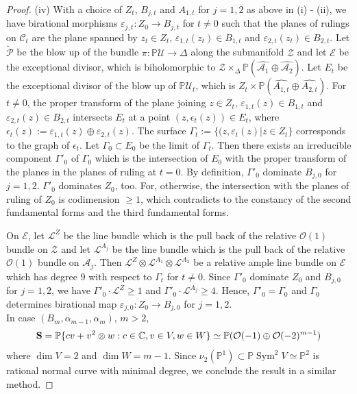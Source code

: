 \documentclass[12pt]{amsart}
\theoremstyle{plain}
\theoremstyle{definition}
\def\Sym{\operatorname{Sym}}
\begin{document}
\begin{proof}
(iv) With a choice of $Z_t$, $B_{j,t}$ and $A_{1,t}$ for $j=1, 2$ as above in (i) - (ii), we have birational morphisms $\varepsilon_{j,t}\colon Z_0 \rightarrow B_{j,t}$ for $t \neq 0$ such that the planes of rulings on $\mathcal C_t$ are the plane spanned by $z_t \in Z_t$, $\varepsilon_{1,t}(z_t)  \in B_{1,t}$ and $\varepsilon_{2,t}(z_t)  \in B_{2,t}$.
Let $\tilde{\mathcal P}$ be the blow up of the bundle $\pi: \mathbb P \mathcal U\rightarrow \Delta$ along the submanifold $\mathcal Z$ and let ${\mathcal E}$ be the exceptional divisor,  which is biholomorphic to $\mathcal Z \times _{\Delta}\mathbb P (\widehat {\mathcal A_1} \oplus \widehat{\mathcal A_2})$. Let $E_t$ be the exceptional divisor of the blow up of $\mathbb P \mathcal U_t$, which is $Z_t \times \mathbb P (\widehat{A_{1,t}} \oplus \widehat{A_{2,t}})$. %
 For $t \neq 0$, the proper transform of the plane joining $z \in Z_t$, $\varepsilon_{1,t}(z)  \in B_{1,t}$ and $\varepsilon_{2,t}(z)  \in B_{2,t}$ intersects $E_t$ at a point $(z,\epsilon_t(z)) \in  E_t$, where $\epsilon_t(z):=\varepsilon_{1,t}(z)\oplus\varepsilon_{2,t}(z)$. The surface $\Gamma_t:=\{(z, \varepsilon_t (z)| z \in Z_t\}$ corresponds to the graph of $\epsilon_t$.
Let $\Gamma_0 \subset E_0$ be the limit of $\Gamma_t$.
%
Then there exists an irreducible component $\Gamma'_0$ of $\Gamma_0$ which is the intersection of $E_0$ with the proper transform of the planes in the planes of ruling at $t=0$. By definition, $\Gamma'_0$ dominate $B_{j,0}$ for $j=1, 2$. $\Gamma'_0$   dominates $Z_0$, too. For, otherwise, the intersection with the planes of ruling of $Z_0$ is codimension $\geq 1$, which contradicts to the constancy of the second fundamental forms and the third fundamental forms.

On $\mathcal E$, let $\mathcal L^Z$ be the line bundle which is the pull back of the relative $\mathcal O(1)$ bundle on $\mathcal Z$ and  let $\mathcal L^{A_j}$ be the line bundle which is the pull back of the relative $\mathcal O(1)$ bundle on $\mathcal A_{j}$. Then $\mathcal L^Z \otimes \mathcal L^{A_1} \otimes \mathcal L^{A_2}$ be a relative ample line bundle on $\mathcal E$ which has degree 9 with respect to $\Gamma_t$ for $t\neq 0$. Since $\Gamma'_0$ dominate $Z_0$ and $B_{j,0}$ for $j=1, 2$, we have $\Gamma'_0\cdot \mathcal L^{Z}\geq 1$ and $\Gamma'_0\cdot \mathcal L^{A_{j}} \geq 4$. Hence, $\Gamma'_0=\Gamma_0$ and $\Gamma_0$ determines birational map $\varepsilon_{j,0} \colon Z_0 \rightarrow B_{j,0}$ for $j=1, 2$. \\

In case $(B_m, \alpha_{m-1}, \alpha_{m})$, $m>2$,
\begin{eqnarray*}{\bf S}=\mathbb P \{ c v + v^2 \otimes w: c \in \mathbb C, v \in V, w \in W\} \simeq \mathbb P(\mathcal O(-1) \oplus \mathcal O(-2)^{m-1})\end{eqnarray*}
where $\dim V =2$ and $\dim W= m-1$. Since $ \nu_2 (\mathbb P^1) \subset \mathbb P \Sym^2 V \simeq  \mathbb P^2$ is rational normal curve with minimal degree, we conclude the result in a similar method.
\end{proof}
\end{document}
